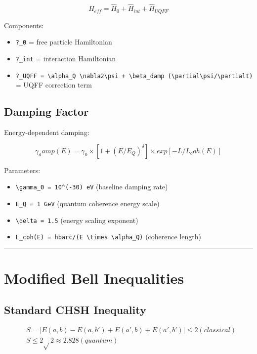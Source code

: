 \documentclass[12pt,a4paper]{article}
\begin{document}
\begin{equation}
\hat{H}_{eff} = \hat{H}_0 + \hat{H}_{int} + \hat{H}_{UQFF}
\end{equation}

Components:

\begin{itemize}
  \item \texttt{?\_0} = free particle Hamiltonian
  \item \texttt{?\_int} = interaction Hamiltonian
  \item \texttt{?\_UQFF = \textbackslash alpha\_Q \textbackslash nabla2\textbackslash psi + \textbackslash beta\_damp (\textbackslash partial\textbackslash psi/\textbackslash partialt)} = UQFF correction term
\end{itemize}

\subsection{Damping Factor}

Energy-dependent damping:

\begin{equation}
\gamma_damp(E) = \gamma_0 \times [1 + (E/E_Q)^\delta] \times exp[-L/L_coh(E)]
\end{equation}

Parameters:

\begin{itemize}
  \item \texttt{\textbackslash gamma\_0 = 10\^{}(-30) eV} (baseline damping rate)
  \item \texttt{E\_Q = 1 GeV} (quantum coherence energy scale)
  \item \texttt{\textbackslash delta = 1.5} (energy scaling exponent)
  \item \texttt{L\_coh(E) = hbarc/(E \textbackslash times \textbackslash alpha\_Q)} (coherence length)
\end{itemize}

\medskip\hrule\medskip

\section{Modified Bell Inequalities}

\subsection{Standard CHSH Inequality}

\begin{equation}
\begin{aligned}
  & S = |E(a,b) - E(a,b') + E(a',b) + E(a',b')| \leq 2 (classical) \\
  & S \leq 2\sqrt{}2 \approx 2.828 (quantum)
\end{aligned}
\end{equation}
\end{document}
